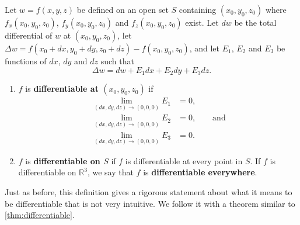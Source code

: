 \begin{definition}\label{def:multi_differentiability3}
Let $w=f(x,y,z)$ be defined on an open set $S$ containing $(x_0,y_0,z_0)$ where $f_x(x_0,y_0,z_0)$, $f_y(x_0,y_0,z_0)$ and $f_z(x_0,y_0,z_0)$ exist. Let $dw$ be the total differential of $w$ at $(x_0,y_0,z_0)$, let $\Delta w = f(x_0+dx,y_0+dy,z_0+dz) - f(x_0,y_0,z_0)$, and let $E_1$, $E_2$ and $E_3$ be functions of $dx$, $dy$ and $dz$  such that
\[\Delta w = dw + E_1dx + E_2dy + E_3dz.\]
\begin{enumerate}
	\item $f$ is \textbf{differentiable at $(x_0,y_0,z_0)$} if%
	\begin{align*}
	 \lim_{(dx,dy,dz)\to(0,0,0)}E_1 &=0,\\
	 \lim_{(dx,dy,dz)\to(0,0,0)}E_2 &=0,\qquad\text{and}\\
	 \lim_{(dx,dy,dz)\to(0,0,0)}E_3 &=0.
	\end{align*}
	\item	$f$ is \textbf{differentiable on $S$} if $f$ is differentiable at every point in $S$. If $f$ is differentiable on $\mathbb{R}^3$, we say that $f$ is \textbf{differentiable everywhere}.
\end{enumerate}
\end{definition}

Just as before, this definition gives a rigorous statement about what it means to be differentiable that is not very intuitive. We follow it with a theorem similar to \autoref{thm:differentiable}.


